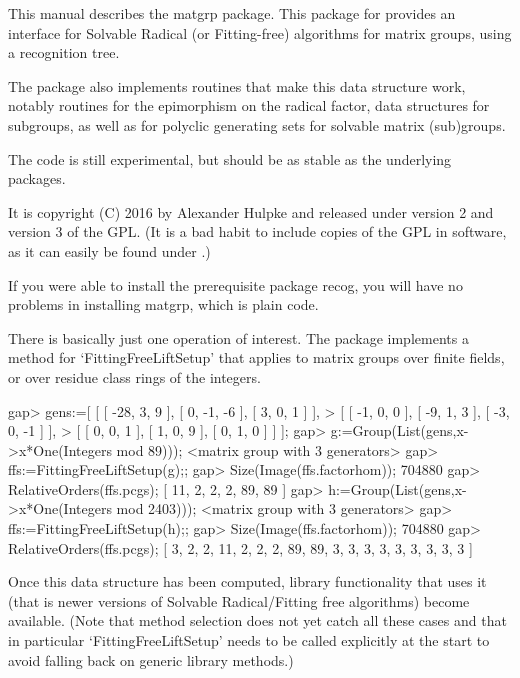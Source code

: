 %
%
%
%


This manual describes the {\sf matgrp} package. This package for {\GAP}
provides an interface for Solvable Radical (or Fitting-free) algorithms for
matrix groups, using a recognition tree.

The package also implements routines that make this data structure work,
notably routines for the epimorphism on the radical factor, data structures for subgroups, as well as for polyclic
generating sets for solvable matrix (sub)groups.

The code is still experimental, but should be as stable as the underlying
packages.

It is copyright (C) 2016 by Alexander Hulpke and released under version 2
and version 3 of the GPL. (It is a bad habit to include copies of the GPL in
software, as it can easily be found under
.)

If you were able to install the prerequisite package {\sf recog}, you will
have no problems in installing {\sf matgrp}, which is plain {\GAP} code.


There is basically just one operation of interest. The package implements a
method for `FittingFreeLiftSetup' that applies to matrix groups over finite
fields, or over residue class rings of the integers.

\beginexample
gap> gens:=[ [ [ -28, 3, 9 ], [ 0, -1, -6 ], [ 3, 0, 1 ] ],   
>   [ [ -1, 0, 0 ], [ -9, 1, 3 ], [ -3, 0, -1 ] ], 
>   [ [ 0, 0, 1 ], [ 1, 0, 9 ], [ 0, 1, 0 ] ] ];
gap> g:=Group(List(gens,x->x*One(Integers mod 89))); 
<matrix group with 3 generators>
gap> ffs:=FittingFreeLiftSetup(g);;
gap> Size(Image(ffs.factorhom));
704880
gap> RelativeOrders(ffs.pcgs);
[ 11, 2, 2, 2, 89, 89 ]
gap> h:=Group(List(gens,x->x*One(Integers mod 2403)));
<matrix group with 3 generators>
gap> ffs:=FittingFreeLiftSetup(h);;
gap> Size(Image(ffs.factorhom));
704880
gap> RelativeOrders(ffs.pcgs);
[ 3, 2, 2, 11, 2, 2, 2, 89, 89, 3, 3, 3, 3, 3, 3, 3, 3, 3 ]
\endexample

Once this data structure has been computed, library functionality that uses
it (that is newer versions of Solvable Radical/Fitting free algorithms)
become available. (Note that method selection does not yet catch all these
cases and that in particular `FittingFreeLiftSetup' needs to be called
explicitly at the start to avoid falling back on generic library methods.)

